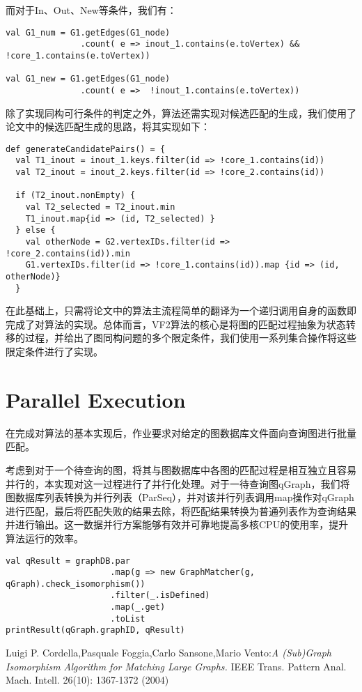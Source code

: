 \documentclass{article}
\begin{document}
而对于In、Out、New等条件，我们有：

\begin{lstlisting}[style=mStyle]
val G1_num = G1.getEdges(G1_node)
               .count( e => inout_1.contains(e.toVertex) && !core_1.contains(e.toVertex))

val G1_new = G1.getEdges(G1_node)
               .count( e =>  !inout_1.contains(e.toVertex))
\end{lstlisting}

除了实现同构可行条件的判定之外，算法还需实现对候选匹配的生成，我们使用了论文中的候选匹配生成的思路，将其实现如下：

\begin{lstlisting}[style=mStyle]
def generateCandidatePairs() = {
  val T1_inout = inout_1.keys.filter(id => !core_1.contains(id))
  val T2_inout = inout_2.keys.filter(id => !core_2.contains(id))

  if (T2_inout.nonEmpty) {
    val T2_selected = T2_inout.min
    T1_inout.map{id => (id, T2_selected) }
  } else {
    val otherNode = G2.vertexIDs.filter(id => !core_2.contains(id)).min
    G1.vertexIDs.filter(id => !core_1.contains(id)).map {id => (id, otherNode)}
  }
\end{lstlisting}

在此基础上，只需将论文中的算法主流程简单的翻译为一个递归调用自身的函数即完成了对算法的实现。总体而言，VF2算法的核心是将图的匹配过程抽象为状态转移的过程，并给出了图同构问题的多个限定条件，我们使用一系列集合操作将这些限定条件进行了实现。

\section{Parallel Execution}

在完成对算法的基本实现后，作业要求对给定的图数据库文件面向查询图进行批量匹配。

考虑到对于一个待查询的图，将其与图数据库中各图的匹配过程是相互独立且容易并行的，本实现对这一过程进行了并行化处理。对于一待查询图qGraph，我们将图数据库列表转换为并行列表（ParSeq），并对该并行列表调用map操作对qGraph进行匹配，最后将匹配失败的结果去除，将匹配结果转换为普通列表作为查询结果并进行输出。这一数据并行方案能够有效并可靠地提高多核CPU的使用率，提升算法运行的效率。

\begin{lstlisting}[style=mStyle]
val qResult = graphDB.par
                     .map(g => new GraphMatcher(g, qGraph).check_isomorphism())
                     .filter(_.isDefined)
                     .map(_.get)
                     .toList
printResult(qGraph.graphID, qResult)
\end{lstlisting}

\begin{thebibliography}{9}

   Luigi P. Cordella,Pasquale Foggia,Carlo Sansone,Mario Vento:\emph{A (Sub)Graph Isomorphism Algorithm for Matching Large Graphs.} IEEE Trans. Pattern Anal. Mach. Intell. 26(10): 1367-1372 (2004)

\end{thebibliography}
\end{document}

